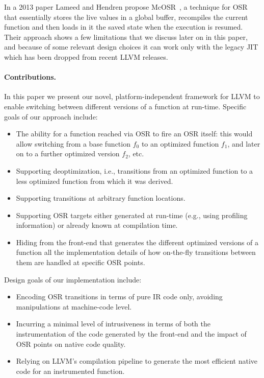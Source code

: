 In a 2013 paper Lameed and Hendren propose McOSR~\cite{lameed2013modular}, a technique for OSR that essentially stores the live values in a global buffer, recompiles the current function and then loads in it the saved state when the execution is resumed. Their approach shows a few limitations that we discuss later on in this paper, and because of some relevant design choices it can work only with the legacy JIT which has been dropped from recent LLVM releases.

\paragraph{Contributions.}
In this paper we present our novel, platform-independent framework for LLVM to enable switching between different versions of a function at run-time. Specific goals of our approach include:
\begin{itemize}
\item The ability for a function reached via OSR to fire an OSR itself: this would allow switching from a base function $f_0$ to an optimized function $f_1$, and later on to a further optimized version $f_2$, etc.
\item Supporting deoptimization, i.e., transitions from an optimized function to a less optimized function from which it was derived.
\item Supporting transitions at arbitrary function locations.
\item Supporting OSR targets either generated at run-time (e.g., using profiling information) or already known at compilation time.
\item Hiding from the front-end that generates the different optimized versions of a function all the implementation details of how on-the-fly transitions between them are handled at specific OSR points.
\end{itemize}

\noindent Design goals of our implementation include:
\begin{itemize}
\item Encoding OSR transitions in terms of pure IR code only, avoiding manipulations at machine-code level.
\item Incurring a minimal level of intrusiveness in terms of both the instrumentation of the code generated by the front-end and the impact of OSR points on native code quality.
\item Relying on LLVM's compilation pipeline to generate the most efficient native code for an instrumented function.
\end{itemize}

